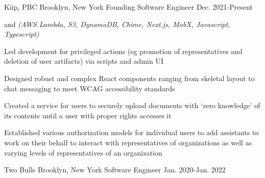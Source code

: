 

\begin{cventries}


  \nrolecventrynoitems
    {Kiip, PBC} %
    {Brooklyn, New York} %
    {Founding Software Engineer} %
    {Dec. 2021-Present} %
    {} %
    {} %
    {} %
    {} %

  \cvcustombody
    { and  \emph{(AWS Lambda, S3, DynamoDB, Chime, Next.js, MobX, Javascript, Typescript)}}
    {
      \begin{cvitems} %
        \item {Led development for privileged actions (eg promotion of representatives and deletion of user artifacts) via scripts and admin UI}
        \item {Designed robust and complex React components ranging from skeletal layout to chat messaging to meet WCAG accessibility standards}
        \item {Created a service for users to securely upload documents with `zero knowledge' of its contents until a user with proper rights accesses it}
        \item {Established various authorization models for individual users to add assistants to work on their behalf to interact with representatives of organizations as well as varying levels of representatives of an organization}
      \end{cvitems}
    }

  \nrolecventrynoitems
    {Two Bulls} %
    {Brooklyn, New York} %
    {Software Engineer} %
    {Jan. 2020-Jan. 2022} %
    {} %
    {} %
    {} %
    {} %


\end{cventries}
